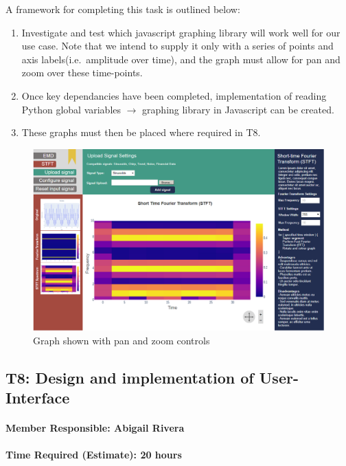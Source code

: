 \documentclass[
  english,
  paper=a4,
  oneside  ,captions=tableheading
]{scrbook}
\begin{document}
A framework for completing this task is outlined below:
\begin{enumerate}
	\item Investigate and test which javascript graphing library will work well for our use case. Note that we intend to supply it only with a series of points and axis labels(i.e.~amplitude over time), and the graph must allow for pan and zoom over these time-points.
	\item Once key dependancies have been completed, implementation of reading Python global variables $\rightarrow$ graphing library in Javascript can be created.
	\item These graphs must then be placed where required in T8.
\end{enumerate}

\begin{figure}
\centering
\includegraphics{img/STFT_upload.PNG}
\caption{Graph shown with pan and zoom controls}
\end{figure}

\newpage
\hypertarget{t8-design-and-implementation-of-user-interface}{%
\subsection{T8: Design and implementation of
User-Interface}\label{t8-design-and-implementation-of-user-interface}}

\hypertarget{member-responsible-abigail-rivera}{%
\paragraph{Member Responsible: Abigail
Rivera}\label{member-responsible-abigail-rivera}}

\hypertarget{time-required-estimate-20-hours-3}{%
\paragraph{Time Required (Estimate): 20
hours}\label{time-required-estimate-20-hours-3}}
\end{document}
